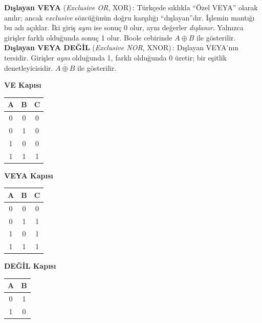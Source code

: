 \begin{terimnotu}
\textbf{Dışlayan VEYA} (\emph{Exclusive OR}, XOR)\,: Türkçede sıklıkla ``Özel VEYA'' olarak anılır; ancak \emph{exclusive} sözcüğünün doğru karşılığı ``dışlayan''dır. İşlemin mantığı bu adı açıklar. İki giriş \emph{aynı} ise sonuç 0 olur, aynı değerler \emph{dışlanır}. Yalnızca girişler farklı olduğunda sonuç 1 olur. Boole cebirinde $A \oplus B$ ile gösterilir.\\[4pt]
\textbf{Dışlayan VEYA DEĞİL} (\emph{Exclusive NOR}, XNOR)\,: Dışlayan VEYA'nın tersidir. Girişler \emph{aynı} olduğunda 1, farklı olduğunda 0 üretir; bir eşitlik denetleyicisidir. $\overline{A \oplus B}$ ile gösterilir.
\end{terimnotu}

\begin{table}[H]
\centering
\begin{minipage}{0.3\textwidth}
\centering
\textbf{VE Kapısı}
\vspace{0.3em}

\begin{tabular}{cc|c}
\toprule
\textbf{A} & \textbf{B} & \textbf{C} \\
\midrule
0 & 0 & 0 \\
0 & 1 & 0 \\
1 & 0 & 0 \\
1 & 1 & 1 \\
\bottomrule
\end{tabular}
\end{minipage}
\hfill
\begin{minipage}{0.3\textwidth}
\centering
\textbf{VEYA Kapısı}
\vspace{0.3em}

\begin{tabular}{cc|c}
\toprule
\textbf{A} & \textbf{B} & \textbf{C} \\
\midrule
0 & 0 & 0 \\
0 & 1 & 1 \\
1 & 0 & 1 \\
1 & 1 & 1 \\
\bottomrule
\end{tabular}
\end{minipage}
\hfill
\begin{minipage}{0.3\textwidth}
\centering
\textbf{DEĞİL Kapısı}
\vspace{0.3em}

\begin{tabular}{c|c}
\toprule
\textbf{A} & \textbf{B} \\
\midrule
0 & 1 \\
1 & 0 \\
\bottomrule
\end{tabular}
\end{minipage}
\end{table}

